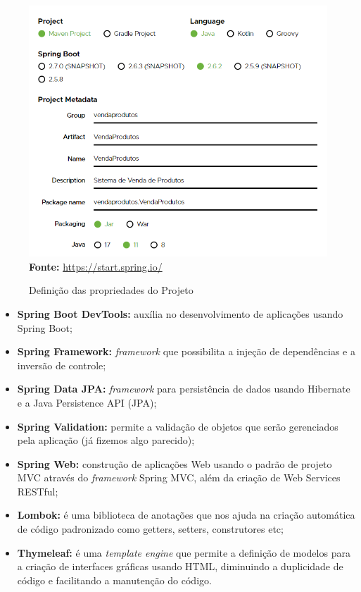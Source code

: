 \FloatBarrier
\begin{figure}[!htbp]
    \centering
    \caption{Definição das propriedades do Projeto}
    \includegraphics[scale=0.7]{imagens/cap10SpringInitializrConfProjeto01}
    \\\textbf{Fonte:} \url{https://start.spring.io/}
    \label{fig:cap10SpringInitializrConfProjeto01}
\end{figure}
\FloatBarrier

\begin{itemize}
    \item \textbf{Spring Boot DevTools:} auxília no desenvolvimento de aplicações usando Spring Boot;
    \item \textbf{Spring Framework:} \textit{framework} que possibilita a injeção de dependências e a inversão de controle;
    \item \textbf{Spring Data JPA:} \textit{framework} para persistência de dados usando Hibernate e a Java Persistence API (JPA);
    \item \textbf{Spring Validation:} permite a validação de objetos que serão gerenciados pela aplicação (já fizemos algo parecido);
    \item \textbf{Spring Web:} construção de aplicações Web usando o padrão de projeto MVC através do \textit{framework} Spring MVC, além da criação de Web Services RESTful;
    \item \textbf{Lombok:} é uma biblioteca de anotações que nos ajuda na criação automática de código padronizado como getters, setters, construtores etc;
    \item \textbf{Thymeleaf:} é uma \textit{template engine} que permite a definição de modelos para a criação de interfaces gráficas usando HTML, diminuindo a duplicidade de código e facilitando a manutenção do código.
\end{itemize}

